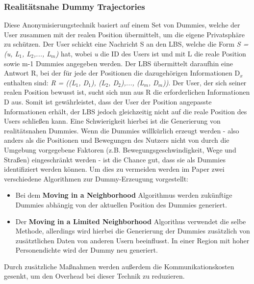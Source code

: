 \subsubsection{Realitätsnahe Dummy Trajectories  \cite{Kido2005}} \label{subsubsection:realdummy}
Diese Anonymisierungstechnik basiert auf einem Set von Dummies, welche der User zusammen mit der realen Position übermittelt, um die eigene Privatsphäre zu schützen. Der User schickt eine Nachricht S an den LBS, welche die Form \textit{S = (u, L$_{1}$, L$_{2}$,..., L$_{m}$)} hat, wobei \textit{u} die ID des Users ist und mit L die reale Position sowie m-1 Dummies angegeben werden. Der LBS übermittelt daraufhin eine Antwort R, bei der für jede der Positionen die dazugehörigen Informationen D$_{x}$ enthalten sind: \textit{R = ((L$_{1}$, D$_{1}$), (L$_{2}$, D$_{2}$),..., (L$_{m}$, D$_{m}$))}. Der User, der sich seiner realen Position bewusst ist, sucht sich nun aus R die erforderlichen Informationen D aus. Somit ist gewährleistet, dass der User der Position angepasste Informationen erhält, der LBS jedoch gleichzeitig nicht auf die reale Position des Users schließen kann.
Eine Schwierigkeit hierbei ist die Generierung von realitätsnahen Dummies. Wenn die Dummies willkürlich erzeugt werden - also anders als die Positionen und Bewegungen des Nutzers nicht von durch die Umgebung vorgegebene Faktoren (z.B. Bewegungsgeschwindigkeit, Wege und Straßen) eingeschränkt werden - ist die Chance gut, dass sie als Dummies identifiziert werden können. Um dies zu vermeiden werden im Paper zwei verschiedene Algorithmen zur Dummy-Erzeugung vorgestellt:
\begin{itemize}
	\item Bei dem \textbf{Moving in a Neighborhood} Algorithmus werden zukünftige Dummies abhängig von der aktuellen Position des Dummies generiert.
	\item Der \textbf{Moving in a Limited Neighborhood} Algorithus verwendet die selbe Methode, allerdings wird hierbei die Generierung der Dummies zusätzlich von zusätztlichen Daten von anderen Usern beeinflusst. In einer Region mit hoher Personendichte wird der Dummy neu generiert.
\end{itemize}
Durch zusätzliche Maßnahmen werden außerdem die Kommunikationskosten gesenkt, um den Overhead bei dieser Technik zu reduzieren.

